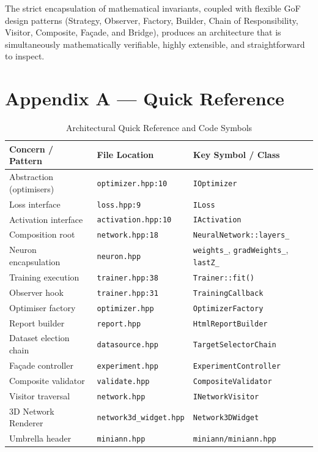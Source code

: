 \documentclass[11pt,a4paper]{article}
\begin{document}
The strict encapsulation of mathematical invariants, coupled with flexible GoF design patterns (Strategy, Observer, Factory, Builder, Chain of Responsibility, Visitor, Composite, Fa\c{c}ade, and Bridge), produces an architecture that is simultaneously mathematically verifiable, highly extensible, and straightforward to inspect.

\section*{Appendix A --- Quick Reference}

\begin{table}[htbp]
\small
\centering
\begin{tabularx}{\textwidth}{llX}
\toprule
\textbf{Concern / Pattern} & \textbf{File Location} & \textbf{Key Symbol / Class} \\
\midrule
Abstraction (optimisers) & \texttt{optimizer.hpp:10} & \texttt{IOptimizer} \\
Loss interface & \texttt{loss.hpp:9} & \texttt{ILoss} \\
Activation interface & \texttt{activation.hpp:10} & \texttt{IActivation} \\
Composition root & \texttt{network.hpp:18} & \texttt{NeuralNetwork::layers\_} \\
Neuron encapsulation & \texttt{neuron.hpp} & \texttt{weights\_}, \texttt{gradWeights\_}, \texttt{lastZ\_} \\
Training execution & \texttt{trainer.hpp:38} & \texttt{Trainer::fit()} \\
Observer hook & \texttt{trainer.hpp:31} & \texttt{TrainingCallback} \\
Optimiser factory & \texttt{optimizer.hpp} & \texttt{OptimizerFactory} \\
Report builder & \texttt{report.hpp} & \texttt{HtmlReportBuilder} \\
Dataset election chain & \texttt{datasource.hpp} & \texttt{TargetSelectorChain} \\
Fa\c{c}ade controller & \texttt{experiment.hpp} & \texttt{ExperimentController} \\
Composite validator & \texttt{validate.hpp} & \texttt{CompositeValidator} \\
Visitor traversal & \texttt{network.hpp} & \texttt{INetworkVisitor} \\
3D Network Renderer & \texttt{network3d\_widget.hpp} & \texttt{Network3DWidget} \\
Umbrella header & \texttt{miniann.hpp} & \texttt{miniann/miniann.hpp} \\
\bottomrule
\end{tabularx}
\caption{Architectural Quick Reference and Code Symbols}
\end{table}
\end{document}
